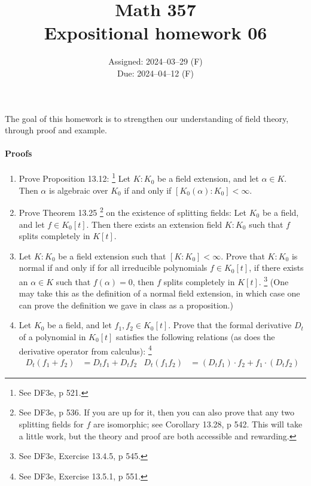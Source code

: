 \documentclass[oneside, english, 11pt]{article}
\title{Math 357\\Expositional homework 06}
\author{}
\date{Assigned: 2024--03--29 (F)\\\hspace{9.7mm}Due: 2024--04--12 (F)}
\begin{document}
\maketitle

The goal of this homework is to strengthen our understanding of field theory, through proof and example.

\paragraph{Proofs}

\begin{enumerate}[label=(\alph*)]
\item\label{itm : EH06a} Prove Proposition 13.12:%
\footnote{See DF3e, p 521.} %
Let $K : K_{0}$ be a field extension, and let $\alpha \in K$. Then $\alpha$ is algebraic over $K_{0}$ if and only if $[K_{0}(\alpha) : K_{0}] < \infty$.
\item\label{itm : EH06b} Prove Theorem 13.25%
\footnote{See DF3e, p 536. If you are up for it, then you can also prove that any two splitting fields for $f$ are isomorphic; see Corollary 13.28, p 542. This will take a little work, but the theory and proof are both accessible and rewarding.} %
on the existence of splitting fields: Let $K_{0}$ be a field, and let $f \in K_{0}[t]$. Then there exists an extension field $K : K_{0}$ such that $f$ splits completely in $K[t]$.
\item\label{itm : EH06c} Let $K : K_{0}$ be a field extension such that $[K : K_{0}] < \infty$. Prove that $K : K_{0}$ is normal if and only if for all irreducible polynomials $f \in K_{0}[t]$, if there exists an $\alpha \in K$ such that $f(\alpha) = 0$, then $f$ splits completely in $K[t]$.%
\footnote{See DF3e, Exercise 13.4.5, p 545.} %
(One may take this as the definition of a normal field extension, in which case one can prove the definition we gave in class as a proposition.)
\item\label{itm : EH06d} Let $K_{0}$ be a field, and let $f_{1}, f_{2} \in K_{0}[t]$. Prove that the formal derivative $D_{t}$ of a polynomial in $K_{0}[t]$ satisfies the following relations (as does the derivative operator from calculus):%
\footnote{See DF3e, Exercise 13.5.1, p 551.}%
\begin{align*}
D_{t}(f_{1} + f_{2})
&=
D_{t} f_{1} + D_{t} f_{2}
&
D_{t}(f_{1} f_{2})
&=
(D_{t} f_{1}) \cdot f_{2} + f_{1} \cdot (D_{t} f_{2})
\end{align*}
\end{enumerate}
\end{document}
